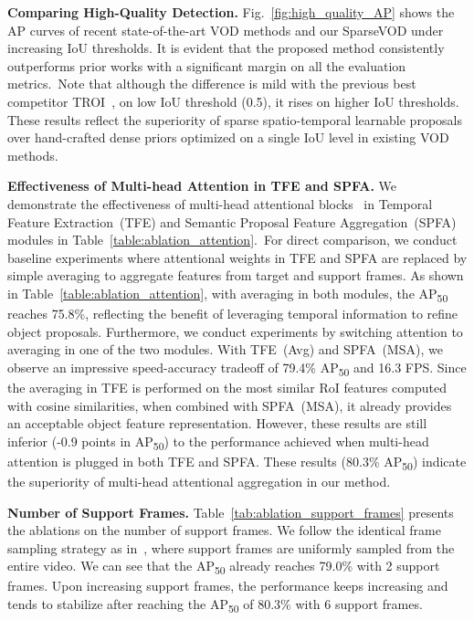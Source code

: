 \documentclass{bmvc2k}
\begin{document}
\vspace{2pt}
\noindent \textbf{Comparing High-Quality Detection.}
Fig.~\ref{fig:high_quality_AP} shows the AP curves of recent state-of-the-art VOD methods and our SparseVOD under increasing IoU thresholds. It is evident that the proposed method consistently outperforms prior works with a significant margin on all the evaluation metrics.~Note that although the difference is mild with the previous best competitor TROI~\cite{gong2021temporal}, on low IoU threshold (0.5), it rises on higher IoU thresholds. These results reflect the superiority of sparse spatio-temporal learnable proposals over hand-crafted dense priors optimized on a single IoU level in existing VOD methods.
\vspace{2pt}

\noindent \textbf{Effectiveness of Multi-head Attention in TFE and SPFA.}
We demonstrate the effectiveness of multi-head attentional blocks~\cite{vaswani2017attention} in Temporal Feature Extraction~(TFE) and Semantic Proposal Feature Aggregation~(SPFA) modules in Table~\ref{table:ablation_attention}.~For direct comparison, we conduct baseline experiments where attentional weights in TFE and SPFA are replaced by simple averaging to aggregate features from target and support frames. As shown in Table~\ref{table:ablation_attention}, with averaging in both modules, the AP\textsubscript{50} reaches 75.8\%, reflecting the benefit of leveraging temporal information to refine object proposals. Furthermore, we conduct experiments by switching attention to averaging in one of the two modules. With TFE~(Avg) and SPFA~(MSA), we observe an impressive speed-accuracy tradeoff of 79.4\% AP\textsubscript{50} and 16.3 FPS. Since the averaging in TFE is performed on the most similar RoI features computed with cosine similarities, when combined with SPFA~(MSA), it already provides an acceptable object feature representation. However, these results are still inferior (-0.9 points in AP\textsubscript{50}) to the performance achieved when multi-head attention is plugged in both TFE and SPFA. These results (80.3\% AP\textsubscript{50}) indicate the superiority of multi-head attentional aggregation in our method.

\noindent \textbf{Number of Support Frames.}
Table~\ref{tab:ablation_support_frames} presents the ablations on the number of support frames. We follow the identical frame sampling strategy as in~\cite{wu2019sequence, gong2021temporal}, where support frames are uniformly sampled from the entire video. We can see that the AP\textsubscript{50} already reaches 79.0\% with 2 support frames. Upon increasing support frames, the performance keeps increasing and tends to stabilize after reaching the AP\textsubscript{50} of 80.3\% with 6 support frames.
\end{document}
